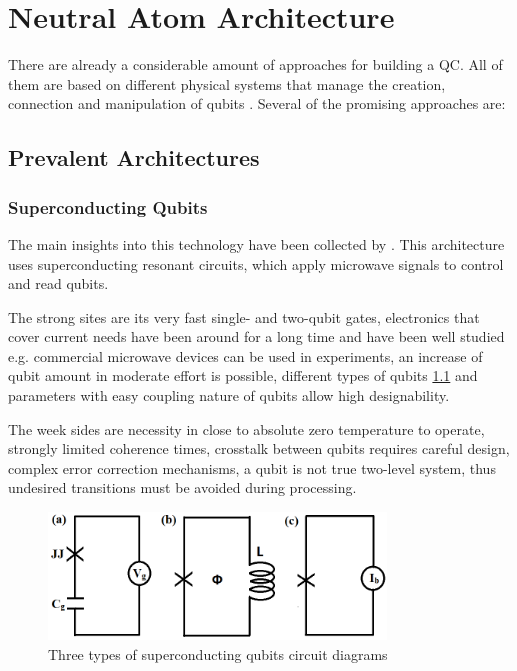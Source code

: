 
\chapter{Neutral Atom Architecture}\label{chapter:neutralatom}
There are already a considerable amount of approaches for building a \ac{QC}.
All of them are based on different physical systems that manage the creation, connection and manipulation of qubits \parencite{Wintersperger_2023}.
Several of the promising approaches are:
\section{Prevalent Architectures}
\subsection{Superconducting Qubits}
The main insights into this technology have been collected by \parencite{Huang_2020}. 
This architecture uses superconducting resonant circuits, which apply microwave signals to control and read qubits. 

The strong sites are its very fast single- and two-qubit gates,
electronics that cover current needs have been around for a long time and have been well studied 
e.g. commercial microwave devices can be used in experiments,
an increase of qubit amount in moderate effort is possible, 
different types of qubits \ref{fig:superconducting} and parameters with easy coupling nature of qubits allow high designability.

The week sides are necessity in close to absolute zero temperature to operate, strongly limited coherence times, 
crosstalk between qubits requires careful design, complex error correction mechanisms,
a qubit is not true two-level system, thus undesired transitions must be avoided during processing.
\begin{figure}[htbp]
  \centering
    \includegraphics[width=0.8\textwidth]{figures/Superconducting.png}
    \caption{Three types of superconducting qubits circuit diagrams \parencite{Huang_2020}}
    \label{fig:superconducting}
\end{figure}

